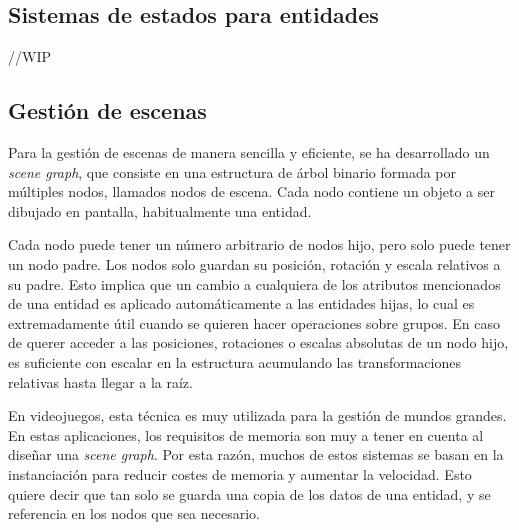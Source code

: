 	\subsection{Sistemas de estados para entidades}

		//WIP

	\subsection{Gestión de escenas}

		Para la gestión de escenas de manera sencilla y eficiente, se ha desarrollado un \textit{scene graph}, que consiste en una estructura de árbol binario formada por múltiples nodos, llamados nodos de escena. Cada nodo contiene un objeto a ser dibujado en pantalla, habitualmente una entidad.

		Cada nodo puede tener un número arbitrario de nodos hijo, pero solo puede tener un nodo padre. Los nodos solo guardan su posición, rotación y escala relativos a su padre. Esto implica que un cambio a cualquiera de los atributos mencionados de una entidad es aplicado automáticamente a las entidades hijas, lo cual es extremadamente útil cuando se quieren hacer operaciones sobre grupos. En caso de querer acceder a las posiciones, rotaciones o escalas absolutas de un nodo hijo, es suficiente con escalar en la estructura acumulando las transformaciones relativas hasta llegar a la raíz.

		En videojuegos, esta técnica es muy utilizada para la gestión de mundos grandes. En estas aplicaciones, los requisitos de memoria son muy a tener en cuenta al diseñar una \textit{scene graph}. Por esta razón, muchos de estos sistemas se basan en la instanciación para reducir costes de memoria y aumentar la velocidad. Esto quiere decir que tan solo se guarda una copia de los datos de una entidad, y se referencia en los nodos que sea necesario.
